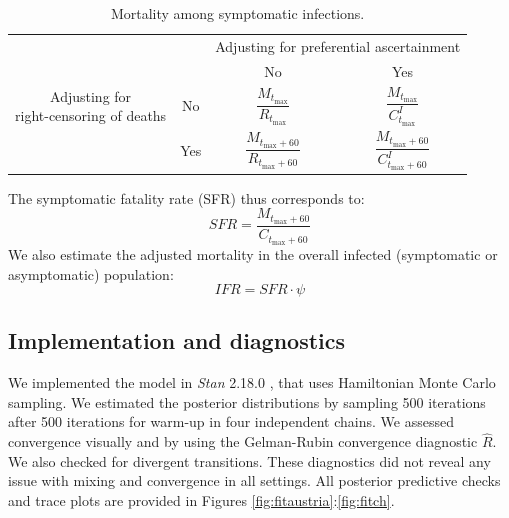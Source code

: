 \documentclass{article}
\begin{document}
\begin{table}[H]
		\centering
		\begin{tabular}{cc|cc}
			

		 & & \multicolumn{2}{c}{Adjusting for preferential ascertainment}\\
		 & & No & Yes \\[3pt]
		 \hline
		\multirowcell{3}{Adjusting for\\[2pt] right-censoring of deaths} & No & $\dfrac{ M_{t_{\text{max}}}}{ R_{t_{\text{max}}}}$ & $\dfrac{ M_{t_{\text{max}}}}{ C_{t_{\text{max}}}^{I}}$\\[20pt]
		& Yes & $\dfrac{ M_{t_{\text{max}}+60}}{ R_{t_{\text{max}}+60}}$ & $\dfrac{ M_{t_{\text{max}}+60}}{ C_{t_{\text{max}}+60}^{I}}$\\[10pt]

		\end{tabular}
		\caption{Mortality among symptomatic infections.}
		\label{tab_cfr}
\end{table}
The symptomatic fatality rate (SFR) thus corresponds to:
\begin{equation}
SFR = \dfrac{ M_{t_{\text{max}}+60}}{ C_{t_{\text{max}}+60}}
\end{equation}	
We also estimate the adjusted mortality in the overall infected (symptomatic or asymptomatic) population:
\begin{equation}
IFR = SFR \cdot \psi
\end{equation}	

\subsection{Implementation and diagnostics}
\label{diag}

We implemented the model in \textit{Stan} 2.18.0 \cite{Carpenter2017}, that uses Hamiltonian Monte Carlo sampling.
We estimated the posterior distributions by sampling 500 iterations after 500 iterations for warm-up in four independent chains.
We assessed convergence visually and by using the Gelman-Rubin convergence diagnostic $\hat{R}$.
We also checked for divergent transitions.
These diagnostics did not reveal any issue with mixing and convergence in all settings.
All posterior predictive checks and trace plots are provided in Figures \ref{fig:fitaustria}:\ref{fig:fitch}.
\end{document}
